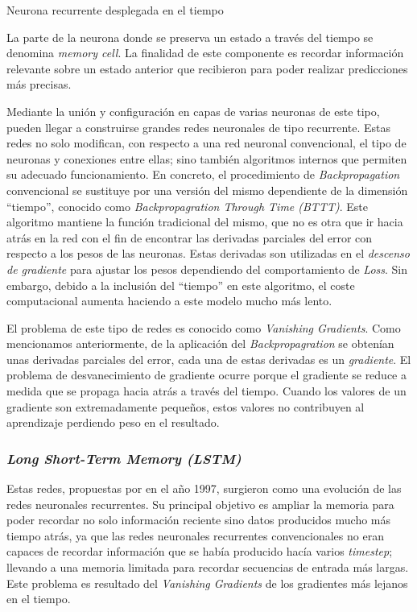 %
{Neurona recurrente desplegada en el tiempo}

La parte de la neurona donde se preserva un estado a través del tiempo se denomina \textit{memory cell}. La finalidad de este componente es recordar información relevante sobre un estado anterior que recibieron para poder realizar predicciones más precisas.

Mediante la unión y configuración en capas de varias neuronas de este tipo, pueden llegar a construirse grandes redes neuronales de tipo recurrente. Estas redes no solo modifican, con respecto a una red neuronal convencional, el tipo de neuronas y conexiones entre ellas; sino también algoritmos internos que permiten su adecuado funcionamiento. En concreto, el procedimiento de \textit{Backpropagation} convencional se sustituye por una versión del mismo dependiente de la dimensión ``tiempo'', conocido como \textit{Backpropagration Through Time (BTTT)}. Este algoritmo mantiene la función tradicional del mismo, que no es otra que ir hacia atrás en la red con el fin de encontrar las derivadas parciales del error con respecto a los pesos de las neuronas. Estas derivadas son utilizadas en el \textit{descenso de gradiente} para ajustar los pesos dependiendo del comportamiento de \textit{Loss}. Sin embargo, debido a la inclusión del ``tiempo'' en este algoritmo, el coste computacional aumenta haciendo a este modelo mucho más lento.

El problema de este tipo de redes es conocido como \textit{Vanishing Gradients}. Como mencionamos anteriormente, de la aplicación del \textit{Backpropagration} se obtenían unas derivadas parciales del error, cada una de estas derivadas es un \textit{gradiente}. El problema de desvanecimiento de gradiente ocurre porque el gradiente se reduce a medida que se propaga hacia atrás a través del tiempo. Cuando los valores de un gradiente son extremadamente pequeños, estos valores no contribuyen al aprendizaje perdiendo peso en el resultado. 

\subsubsection{\textit{Long Short-Term Memory (LSTM)}}
Estas redes, propuestas por \citep{lstm} en el año 1997, surgieron como una evolución de las redes neuronales recurrentes. Su principal objetivo es ampliar la memoria para poder recordar no solo información reciente sino datos producidos mucho más tiempo atrás, ya que las redes neuronales recurrentes convencionales no eran capaces de recordar información que se había producido hacía varios \textit{timestep}; llevando a una memoria limitada para recordar secuencias de entrada más largas. Este problema es resultado del \textit{Vanishing Gradients} de los gradientes más lejanos en el tiempo.

